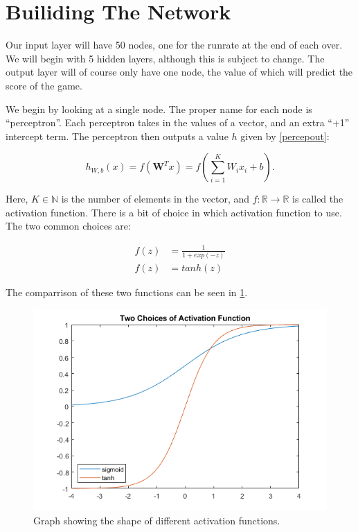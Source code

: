 \section{Builiding The Network}
Our input layer will have 50 nodes, one for the runrate at the end of each over. We will begin with 5 hidden layers, although this is subject to change. The output layer
will of course only have one node, the value of which will predict the score of the game. 

We begin by looking at a single node. The proper name for each node is ``perceptron''. Each perceptron takes in the values of a vector, and an extra ``+1'' intercept term. The perceptron then outputs a value $h$ given by \ref{percepout}:

\begin{equation}
    \label{percepout}
    h_{W,b}(x) = f(\textbf{W}^Tx) = f(\sum_{i=1}^KW_ix_i+b).
\end{equation}

Here, $K \in \mathbb{N}$ is the number of elements in the vector, and $f:\mathbb{R} \rightarrow \mathbb{R}$ is called the activation function. There is a bit of choice in which activation function to use.
The two common choices are:

\begin{align}
    \label{sigmoid_func}
    f(z) &= \frac{1}{1+exp(-z)} \\
    f(z) &= tanh(z)
\end{align}

The comparrison of these two functions can be seen in \ref{actfig}.

\begin{figure}[h]
    \centering
    \includegraphics[scale=0.5]{figures/actfuncs.png}
    \caption{Graph showing the shape of different activation functions.}
    \label{actfig}
\end{figure}

